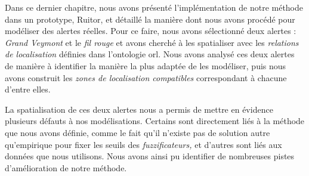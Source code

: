 Dans ce dernier chapitre, nous avons présenté l'implémentation de
notre méthode dans un prototype, Ruitor, et détaillé la manière dont
nous avons procédé pour modéliser des alertes réelles. Pour ce faire,
nous avons sélectionné deux alertes : \emph{Grand Veymont} et le
\emph{fil rouge} et avons cherché à les spatialiser avec les
\emph{relations de localisation} définies dans l'ontologie
\ac{orl}. Nous avons analysé ces deux alertes de manière à identifier
la manière la plus adaptée de les modéliser, puis nous avons construit
les \emph{zones de localisation compatibles} correspondant à chacune
d'entre elles.

La spatialisation de ces deux alertes nous a permis de mettre en
évidence plusieurs défauts à nos modélisations. Certains sont
directement liés à la méthode que nous avons définie, comme le fait
qu'il n'existe pas de solution autre qu'empirique pour fixer les
seuils des \emph{fuzzificateurs,} et d'autres sont liés aux données
que nous utilisons. Nous avons ainsi pu identifier de nombreuses
pistes d'amélioration de notre méthode.


